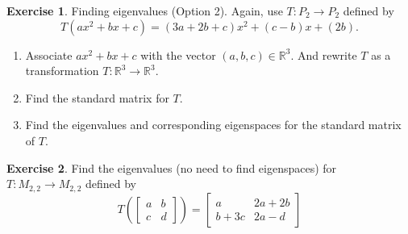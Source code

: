 \documentclass{beamer}
\newcommand{\R}{\mathbb{R}}
\newcommand{\fn}{\insertframenumber}
\theoremstyle{definition}
\newtheorem{exercise}{Exercise}
\begin{document}
\begin{frame}{\fn}
	\begin{exercise}
		Finding eigenvalues (Option 2).  Again, use $T:P_2\to P_2$ defined by
			\[T(ax^2+bx+c)=(3a+2b+c)x^2+(c-b)x+(2b).\]
		\begin{enumerate}[label=(\alph*)]
			\item Associate $ax^2+bx+c$ with the vector $(a,b,c)\in \R^3$. And rewrite $T$ as a transformation $T:\R^3\to\R^3$.
			\item Find the standard matrix for $T$.
			\item Find the eigenvalues and corresponding eigenspaces for the standard matrix of $T$.
		\end{enumerate}
	\end{exercise}
\end{frame}
\begin{frame}{\fn}
	\begin{exercise}
		Find the eigenvalues (no need to find eigenspaces) for $T:M_{2,2}\to M_{2,2}$ defined by
			\[T\left(\begin{bmatrix}a&b\\c&d\end{bmatrix}\right)=\begin{bmatrix}
			a&2a+2b\\b+3c&2a-d
			\end{bmatrix}\]
	\end{exercise}%
\end{frame}
\end{document}

